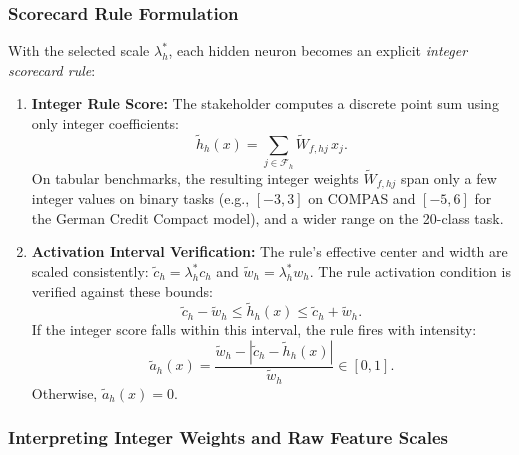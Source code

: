 \subsubsection{Scorecard Rule Formulation}
With the selected scale $\lambda_h^*$, each hidden neuron becomes an explicit \emph{integer scorecard rule}:
\begin{enumerate}
    \item \textbf{Integer Rule Score:} The stakeholder computes a discrete point sum using only integer coefficients:
    \begin{equation}
    \tilde{h}_h(x) = \sum_{j \in \mathcal{F}_h} \widetilde{W}_{f,hj} \, x_j.
    \end{equation}
    On tabular benchmarks, the resulting integer weights $\widetilde{W}_{f,hj}$ span only a few integer values on binary tasks (e.g., $[-3, 3]$ on COMPAS and $[-5, 6]$ for the German Credit Compact model), and a wider range on the 20-class task.
    \item \textbf{Activation Interval Verification:} The rule's effective center and width are scaled consistently: $\widetilde{c}_h = \lambda_h^* c_h$ and $\widetilde{w}_h = \lambda_h^* w_h$. The rule activation condition is verified against these bounds:
    \begin{equation}
    \widetilde{c}_h - \widetilde{w}_h \le \tilde{h}_h(x) \le \widetilde{c}_h + \widetilde{w}_h.
    \end{equation}
    If the integer score falls within this interval, the rule fires with intensity:
    \begin{equation}
    \tilde{a}_h(x) = \frac{\widetilde{w}_h - |\widetilde{c}_h - \tilde{h}_h(x)|}{\widetilde{w}_h} \in [0, 1].
    \end{equation}
    Otherwise, $\tilde{a}_h(x) = 0$.
\end{enumerate}

\subsubsection{Interpreting Integer Weights and Raw Feature Scales}
\label{subsubsec:standardized_vs_raw}

